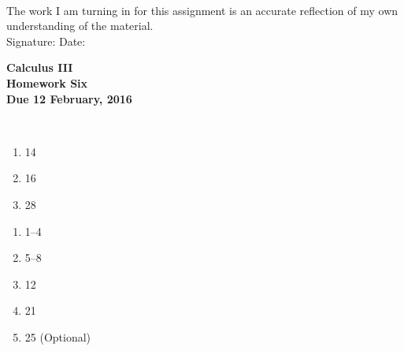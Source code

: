 \documentclass[12pt]{article}
\begin{document}
\\

\bigskip
\bigskip
\bigskip
\bigskip
\bigskip
\bigskip
\noindent The work I am turning in for this assignment is an accurate
reflection of my own understanding of the material.\\[14pt]

\noindent Signature: \underline{\hspace{7cm}} \hspace{1cm} Date:
\underline{\hspace{5cm}} 


\pagestyle{empty}
 
\begin{center}
{\large {\bf Calculus III}}\\
\medskip
{\large {\bf Homework Six}}\\
\medskip
{ {\bf Due 12 February, 2016}}\\
\end{center}

\hspace{2mm}\\




\begin{enumerate}
\setlength{\itemsep}{-1mm}
  \item 14
  \item 16
  \item 28 
\end{enumerate}

\begin{enumerate}
\setlength{\itemsep}{-1mm}
  \item 1--4
  \item 5--8
  \item 12
  \item 21
  \item 25 (Optional)
\end{enumerate}

\end{document}
